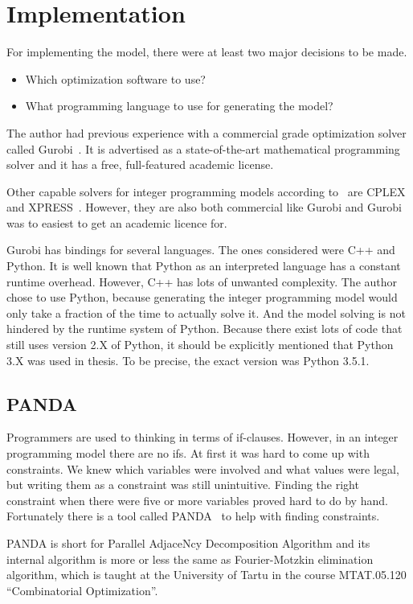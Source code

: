\section{Implementation}
For implementing the model, there were at least two major decisions to be made.
\begin{itemize}
    \item Which optimization software to use?
    \item What programming language to use for generating the model?
\end{itemize}
The author had previous experience with a commercial grade optimization solver
called Gurobi~\cite{gurobi}. It is advertised as a state-of-the-art
mathematical programming solver and it has a free, full-featured academic
license.

Other capable solvers for integer programming models according
to~\cite{meindl2012analysis,mittleman} are CPLEX~\cite{cplex} and XPRESS~\cite{xpress}.
However, they are also both commercial like Gurobi and Gurobi was to easiest to
get an academic licence for.

Gurobi has bindings for several languages. The ones considered were C++ and
Python. It is well known that Python as an interpreted language has a constant
runtime overhead. However, C++ has lots of unwanted complexity. The author
chose to use Python, because generating the integer programming model would
only take a fraction of the time to actually solve it. And the model solving
is not hindered by the runtime system of Python. Because there exist lots of
code that still uses version 2.X of Python, it should be explicitly
mentioned that Python 3.X was used in thesis. To be precise, the exact version
was Python 3.5.1.
\subsection{PANDA}
Programmers are used to thinking in terms of if-clauses. However, in an integer
programming model there are no ifs. At first it was hard to come up with
constraints. We knew which variables were involved and what values were legal,
but writing them as a constraint was still unintuitive. Finding the right
constraint when there were five or more variables proved hard to do by
hand. Fortunately there is a tool called PANDA~\cite{panda} to help with
finding constraints.

PANDA is short for Parallel AdjaceNcy Decomposition Algorithm and its internal
algorithm is more or less the same as Fourier-Motzkin elimination algorithm,
which is taught at the University of Tartu in the course MTAT.05.120
``Combinatorial Optimization''.

